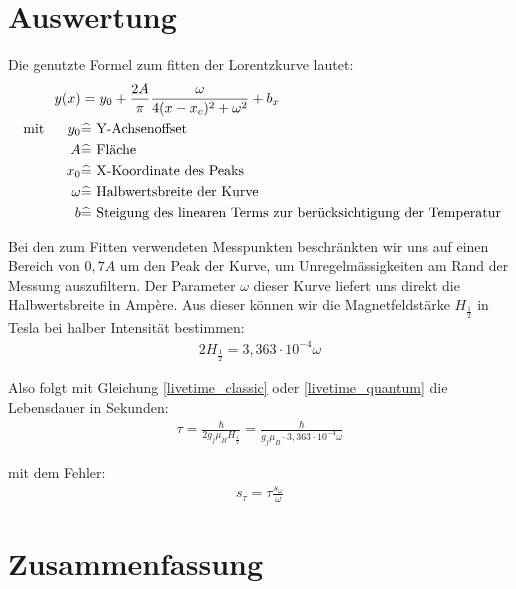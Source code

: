 \documentclass[12pt]{article}
\begin{document}
\section{Auswertung}
Die genutzte Formel zum fitten der Lorentzkurve lautet:
\begin{align}
 y(x) &= y_0+\frac{2A}{\pi}\frac{\omega}{4(x-x_c)^2+\omega^2}+b_x \\
\notag \textnormal{ mit }~~~~ y_0 &\widehat{=} \textnormal{ Y-Achsenoffset } \\
\notag A &\widehat{=} \textnormal{ Fläche } \\
\notag x_0 &\widehat{=} \textnormal{ X-Koordinate des Peaks } \\
\notag \omega &\widehat{=} \textnormal{ Halbwertsbreite der Kurve } \\
\notag b &\widehat{=} \textnormal{ Steigung des linearen Terms zur berücksichtigung der Temperatur}
\end{align}

Bei den zum Fitten verwendeten Messpunkten beschränkten wir uns auf einen Bereich von $0,7A$ um den Peak der Kurve, um Unregelmässigkeiten am Rand der Messung auszufiltern. Der Parameter $\omega$ dieser Kurve liefert uns direkt die Halbwertsbreite in Ampère. Aus dieser können wir die Magnetfeldstärke $H_{\frac{1}{2}}$ in Tesla bei halber Intensität bestimmen:
\begin{align}
 2H_{\frac{1}{2}}= 3,363\cdot 10^{-4} \omega
\end{align}

Also folgt mit Gleichung \ref{livetime_classic} oder \ref{livetime_quantum} die Lebensdauer in Sekunden:
\begin{align}
 \tau = \frac{\hbar}{2g_j \mu_B H_{\frac{1}{2}}} = \frac{\hbar}{g_j \mu_B\cdot 3,363\cdot 10^{-4} \omega}
\end{align}

mit dem Fehler:
\begin{align}
 s_{\tau}=\tau \frac{s_{\omega}}{\omega}
\end{align}







\section{Zusammenfassung}
\singlespacing

\end{document}
